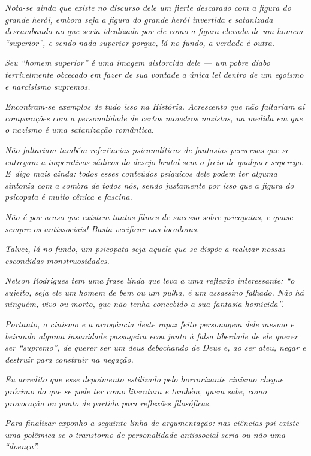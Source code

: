 \emph{Nota-se ainda que existe no discurso dele um flerte descarado com
a figura do grande herói, embora seja a figura do grande herói invertida
e satanizada descambando no que seria idealizado por ele como a figura
elevada de um homem ``superior'', e sendo nada superior porque, lá no
fundo, a verdade é outra.}

\emph{Seu ``homem superior'' é uma imagem distorcida dele --- um pobre
diabo terrivelmente obcecado em fazer de sua vontade a única lei dentro
de um egoísmo e narcisismo supremos.}

\emph{Encontram-se exemplos de tudo isso na História. Acrescento que não
faltariam aí comparações com a personalidade de certos monstros
nazistas, na medida em que o nazismo é uma satanização romântica.}

\emph{Não faltariam também referências psicanalíticas de fantasias
perversas que se entregam a imperativos sádicos do desejo brutal sem o
freio de qualquer superego. E~digo mais ainda: todos esses conteúdos
psíquicos dele podem ter alguma sintonia com a sombra de todos nós,
sendo justamente por isso que a figura do psicopata é muito cênica e
fascina.}

\emph{Não é por acaso que existem tantos filmes de sucesso sobre
psicopatas, e quase sempre os antissociais! Basta verificar nas
locadoras.}

\emph{Talvez, lá no fundo, um psicopata seja aquele que se dispõe a
realizar nossas escondidas monstruosidades.}

\emph{Nelson Rodrigues tem uma frase linda que leva a uma reflexão
interessante: ``o sujeito, seja ele um homem de bem ou um pulha, é um
assassino falhado. Não há ninguém, vivo ou morto, que não tenha
concebido a sua fantasia homicida''.}

\emph{Portanto, o cinismo e a arrogância deste rapaz feito personagem
dele mesmo e beirando alguma insanidade passageira ecoa junto à falsa
liberdade de ele querer ser ``supremo'', de querer ser um deus
debochando de Deus e, ao ser ateu, negar e destruir para construir na
negação.}

\emph{Eu acredito que esse depoimento estilizado pelo horrorizante
cinismo chegue próximo do que se pode ter como literatura e também, quem
sabe, como provocação ou ponto de partida para reflexões filosóficas.}

\emph{Para finalizar exponho a seguinte linha de argumentação: nas
ciências psi existe uma polêmica se o transtorno de personalidade
antissocial seria ou não uma ``doença''.}

